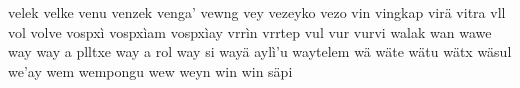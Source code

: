\documentclass[a4paper]{article}
\begin{document}
velek\hspace{2mm}
velke\hspace{2mm}
venu\hspace{2mm}
venzek\hspace{2mm}
venga'\hspace{2mm}
vewng\hspace{2mm}
vey\hspace{2mm}
vezeyko\hspace{2mm}
vezo\hspace{2mm}
vin\hspace{2mm}
vingkap\hspace{2mm}
virä\hspace{2mm}
vitra\hspace{2mm}
vll\hspace{2mm}
vol\hspace{2mm}
volve\hspace{2mm}
vospxì\hspace{2mm}
vospxìam\hspace{2mm}
vospxìay\hspace{2mm}
vrrìn\hspace{2mm}
vrrtep\hspace{2mm}
vul\hspace{2mm}
vur\hspace{2mm}
vurvi\hspace{2mm}
walak\hspace{2mm}
wan\hspace{2mm}
wawe\hspace{2mm}
way\hspace{2mm}
way a plltxe\hspace{2mm}
way a rol\hspace{2mm}
way si\hspace{2mm}
wayä aylì'u\hspace{2mm}
waytelem\hspace{2mm}
wä\hspace{2mm}
wäte\hspace{2mm}
wätu\hspace{2mm}
wätx\hspace{2mm}
wäsul\hspace{2mm}
we'ay\hspace{2mm}
wem\hspace{2mm}
wempongu\hspace{2mm}
wew\hspace{2mm}
weyn\hspace{2mm}
win\hspace{2mm}
win säpi\hspace{2mm}
\end{document}
